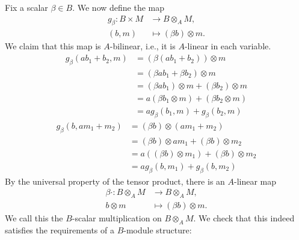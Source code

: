 \documentclass[12pt]{article}
\theoremstyle{definition}
\newcommand{\<}{\langle}
\renewcommand{\>}{\rangle}
\newcommand{\tensor}{\otimes}
\begin{document}
Fix a scalar $\beta \in B$.
We now define the map
\begin{align*}
    g_\beta : B \times M &\longrightarrow B \tensor_A M, \\
    (b, m) &\longmapsto (\beta b) \tensor m.
\end{align*}
We claim that this map is $A$-bilinear, i.e., it is $A$-linear in each variable.
\begin{align*}
    g_\beta(ab_1 + b_2, m)
        &= (\beta(ab_1 + b_2)) \tensor m \\
        &= (\beta ab_1 + \beta b_2) \tensor m \\
        &= (\beta ab_1) \tensor m + (\beta b_2) \tensor m \\
        &= a(\beta b_1 \tensor m) + (\beta b_2 \tensor m) \\
        &= a g_\beta(b_1, m) + g_\beta(b_2, m)
\end{align*}
\begin{align*}
    g_\beta(b, am_1 + m_2)
        &= (\beta b) \tensor (am_1 + m_2) \\
        &= (\beta b) \tensor am_1 + (\beta b) \tensor m_2 \\
        &= a((\beta b) \tensor m_1) + (\beta b) \tensor m_2 \\
        &= a g_\beta(b, m_1) + g_\beta(b, m_2)
\end{align*}
By the universal property of the tensor product, there is an $A$-linear map
\begin{align*}
    \beta\cdot : B \tensor_A M &\longrightarrow B \tensor_A M, \\
        b \tensor m &\longmapsto (\beta b) \tensor m.
\end{align*}
We call this the $B$-scalar multiplication on $B \tensor_A M$.
We check that this indeed satisfies the requirements of a $B$-module structure:
\end{document}
